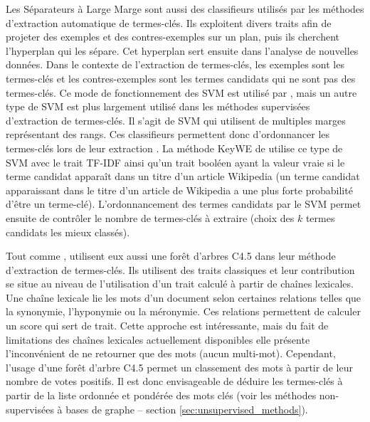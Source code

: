     Les Séparateurs à Large Marge sont aussi des classifieurs utilisés par les
    méthodes d'extraction automatique de termes-clés. Ils exploitent divers
    traits afin de projeter des exemples et des contres-exemples sur un plan,
    puis ils cherchent l'hyperplan qui les sépare. Cet hyperplan sert ensuite
    dans l'analyse de nouvelles données. Dans le contexte de l'extraction de
    termes-clés, les exemples sont les termes-clés et les contres-exemples sont
    les termes candidats qui ne sont pas des termes-clés. Ce mode de
    fonctionnement des SVM est utilisé par \citet{zhang2006svm}, mais un autre
    type de SVM est plus largement utilisé dans les méthodes supervisées
    d'extraction de termes-clés. Il s'agit de SVM qui utilisent de multiples
    marges représentant des rangs. Ces classifieurs permettent donc
    d'ordonnancer les termes-clés lors de leur extraction
    \citep{herbrich1999svm, joachims2006linearsvm, jiang2009rankingsvm}.
    La méthode KeyWE de \citet{eichler2010keywe} utilise ce type de SVM avec
    le trait TF-IDF ainsi qu'un trait booléen ayant la valeur vraie si le terme
    candidat apparaît dans un titre d'un article Wikipedia (un terme candidat
    apparaissant dans le titre d'un article de Wikipedia a une plus forte
    probabilité d'être un terme-clé). L'ordonnancement des termes candidats par
    le SVM permet ensuite de contrôler le nombre de termes-clés à extraire
    (choix des $k$ termes candidats les mieux classés).

    Tout comme \citet{turney1999learningalgorithms},
    \citet{ercan2007lexicalchains} utilisent eux aussi une forêt d'arbres C4.5
    dans leur méthode d'extraction de termes-clés. Ils utilisent des traits
    classiques et leur contribution se situe au niveau de l'utilisation d'un
    trait calculé à partir de chaînes lexicales. Une chaîne lexicale lie les
    mots d'un document selon certaines relations telles que la synonymie,
    l'hyponymie ou la méronymie. Ces relations permettent de calculer un score
    qui sert de trait. Cette approche est intéressante, mais du fait de
    limitations des chaînes lexicales actuellement disponibles elle présente
    l'inconvénient de ne retourner que des mots (aucun multi-mot). Cependant,
    l'usage d'une forêt d'arbre C4.5 permet un classement des mots à partir de
    leur nombre de votes positifs. Il est donc envisageable de déduire les
    termes-clés à partir de la liste ordonnée et pondérée des mots clés (voir
    les méthodes non-supervisées à bases de graphe -- section
    \ref{sec:unsupervised_methods}).

